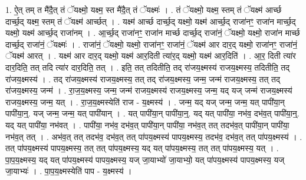 \documentclass[17pt]{extarticle}
\begin{document}
1. ऐ॒त् तम् त मै॑दै॒त् तं ॅयक्ष्मो॒ यक्ष्म॒ स्त मै॑दै॒त् तं ॅयक्ष्मः॑ । . तं ॅयक्ष्मो॒ यक्ष्म॒ स्तम् तं ॅयक्ष्म॑ आर्च्छ दार्च्छ॒द् यक्ष्म॒ स्तम् तं ॅयक्ष्म॑ आर्च्छत् । . यक्ष्म॑ आर्च्छ दार्च्छ॒द् यक्ष्मो॒ यक्ष्म॑ आर्च्छ॒द् राजा॑नꣳ॒॒ राजा॑न मार्च्छ॒द् यक्ष्मो॒ यक्ष्म॑ आर्च्छ॒द् राजा॑नम् । . आ॒र्च्छ॒द् राजा॑नꣳ॒॒ राजा॑न मार्च्छ दार्च्छ॒द् राजा॑नं॒ ॅयक्ष्मो॒ यक्ष्मो॒ राजा॑न मार्च्छ दार्च्छ॒द् राजा॑नं॒ ॅयक्ष्मः॑ । . राजा॑नं॒ ॅयक्ष्मो॒ यक्ष्मो॒ राजा॑नꣳ॒॒ राजा॑नं॒ ॅयक्ष्म॑ आर दार॒द् यक्ष्मो॒ राजा॑नꣳ॒॒ राजा॑नं॒ ॅयक्ष्म॑ आरत् । . यक्ष्म॑ आर दार॒द् यक्ष्मो॒ यक्ष्म॑ आर॒दिती त्या॑र॒द् यक्ष्मो॒ यक्ष्म॑ आर॒दिति॑ । . आ॒र॒ दिती त्या॑र दार॒दिति॒ तत् तदि त्या॑र दार॒दिति॒ तत् । . इति॒ तत् तदितीति॒ तद् रा॑जय॒क्ष्मस्य॑ राजय॒क्ष्मस्य॒ तदितीति॒ तद् रा॑जय॒क्ष्मस्य॑ । . तद् रा॑जय॒क्ष्मस्य॑ राजय॒क्ष्मस्य॒ तत् तद् रा॑जय॒क्ष्मस्य॒ जन्म॒ जन्म॑ राजय॒क्ष्मस्य॒ तत् तद् रा॑जय॒क्ष्मस्य॒ जन्म॑ । . रा॒ज॒य॒क्ष्मस्य॒ जन्म॒ जन्म॑ राजय॒क्ष्मस्य॑ राजय॒क्ष्मस्य॒ जन्म॒ यद् यज् जन्म॑ राजय॒क्ष्मस्य॑ राजय॒क्ष्मस्य॒ जन्म॒ यत् । . रा॒ज॒य॒क्ष्मस्येति॑ राज - य॒क्ष्मस्य॑ । . जन्म॒ यद् यज् जन्म॒ जन्म॒ यत् पापी॑या॒न् पापी॑या॒न्॒. यज् जन्म॒ जन्म॒ यत् पापी॑यान् । . यत् पापी॑या॒न् पापी॑या॒न्॒. यद् यत् पापी॑या॒ नभ॑व॒ दभ॑व॒त् पापी॑या॒न्॒. यद् यत् पापी॑या॒ नभ॑वत् । . पापी॑या॒ नभ॑व॒ दभ॑व॒त् पापी॑या॒न् पापी॑या॒ नभ॑व॒त् तत् तदभ॑व॒त् पापी॑या॒न् पापी॑या॒ नभ॑व॒त् तत् । . अभ॑व॒त् तत् तदभ॑व॒ दभ॑व॒त् तत् पा॑पय॒क्ष्मस्य॑ पापय॒क्ष्मस्य॒ तदभ॑व॒ दभ॑व॒त् तत् पा॑पय॒क्ष्मस्य॑ । . तत् पा॑पय॒क्ष्मस्य॑ पापय॒क्ष्मस्य॒ तत् तत् पा॑पय॒क्ष्मस्य॒ यद् यत् पा॑पय॒क्ष्मस्य॒ तत् तत् पा॑पय॒क्ष्मस्य॒ यत् । . पा॒प॒य॒क्ष्मस्य॒ यद् यत् पा॑पय॒क्ष्मस्य॑ पापय॒क्ष्मस्य॒ यज् जा॒याभ्यो॑ जा॒याभ्यो॒ यत् पा॑पय॒क्ष्मस्य॑ पापय॒क्ष्मस्य॒ यज् जा॒याभ्यः॑ । . पा॒प॒य॒क्ष्मस्येति॑ पाप - य॒क्ष्मस्य॑ । \newline
\end{document}
